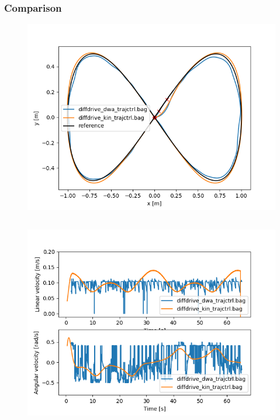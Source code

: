\documentclass{beamer}
\begin{document}
\begin{frame}[allowframebreaks]
\frametitle{Comparison}

\vspace{-2em}

\begin{figure}[H]
    \centering
    \includegraphics[scale=0.6]{img/comparison/Trajectory.png}
\end{figure}

\framebreak

\begin{columns}


\vspace{-2em}

\begin{figure}[H]
    \centering
    \includegraphics[scale=0.3]{img/comparison/Linear_and_Angular_Velocities.png}
\end{figure}


\end{columns}
\end{frame}
\end{document}
